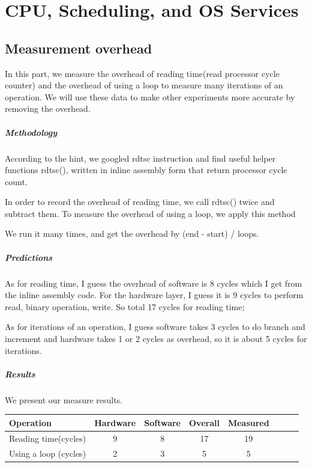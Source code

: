 \chapter{CPU, Scheduling, and OS Services}

\section{Measurement overhead}
In this part, we measure the overhead of reading time(read processor cycle counter) and the overhead of using a loop to measure many iterations of an operation. We will use these data to make other experiments more accurate by removing the overhead.

\paragraph{Methodology}
According to the hint, we googled rdtsc instruction and find useful helper functions rdtsc()\cite{rdtsc}, written in inline assembly form that return processor cycle count. 

In order to record the overhead of reading time, we call rdtsc() twice and subtract them. To measure the overhead of using a loop, we apply this method

We run it many times, and get the overhead by (end - start) / loops.

\paragraph{Predictions}
As for reading time, I guess the overhead of software is 8 cycles which I get from the inline assembly code. For the hardware layer, I guess it is 9 cycles to perform read, binary operation, write. So total 17 cycles for reading time; 

As for iterations of an operation, I guess software takes 3 cycles to do branch and increment and hardware takes 1 or 2 cycles as overhead, so it is about 5 cycles for iterations.

\paragraph{Results}
We present our measure results.

\begin{center}
\begin{tabular}{l*{6}{c}r}
Operation              & Hardware  & Software  & Overall  & Measured   \\
\hline
Reading time(cycles) & 9 & 8 & 17 & 19  \\
Using a loop (cycles)           & 2 & 3 & 5 & 5 \\
\end{tabular}
\end{center}

